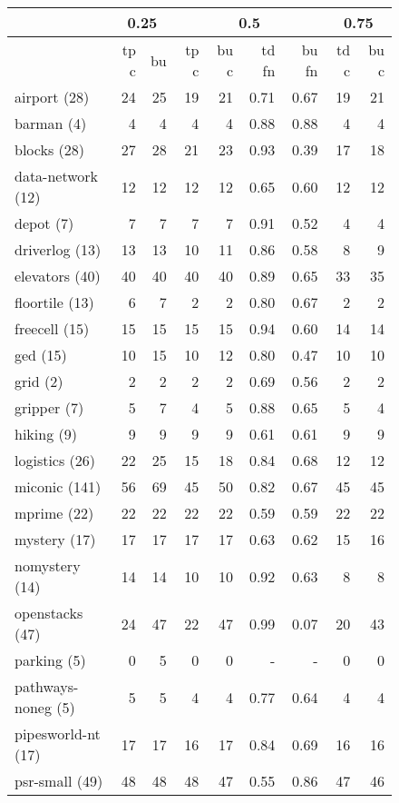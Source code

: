 \begin{figure}[ht]
	\small
\begin{tabular}{l||rr||rr|rr||rr}
	& \multicolumn{2}{c}{0.25} & \multicolumn{4}{c}{0.5} & \multicolumn{2}{c}{0.75} \\\hline
		& tp c & bu & tp c & bu c & td fn & bu fn & td c & bu c \\\hline
		airport (28) & 24 & 25 & 19 & 21 & 0.71 & 0.67 & 19 & 21\\
		barman (4) & 4 & 4 & 4 & 4 & 0.88 & 0.88 & 4 & 4\\
		blocks (28) & 27 & 28 & 21 & 23 & 0.93 & 0.39 & 17 & 18\\
		data-network (12) & 12 & 12 & 12 & 12 & 0.65 & 0.60 & 12 & 12\\
		depot (7) & 7 & 7 & 7 & 7 & 0.91 & 0.52 & 4 & 4\\
		driverlog (13) & 13 & 13 & 10 & 11 & 0.86 & 0.58 & 8 & 9\\
		elevators (40) & 40 & 40 & 40 & 40 & 0.89 & 0.65 & 33 & 35\\
		floortile (13) & 6 & 7 & 2 & 2 & 0.80 & 0.67 & 2 & 2\\
		freecell (15) & 15 & 15 & 15 & 15 & 0.94 & 0.60 & 14 & 14\\
		ged (15) & 10 & 15 & 10 & 12 & 0.80 & 0.47 & 10 & 10\\
		grid (2) & 2 & 2 & 2 & 2 & 0.69 & 0.56 & 2 & 2\\
		gripper (7) & 5 & 7 & 4 & 5 & 0.88 & 0.65 & 5 & 4\\
		hiking (9) & 9 & 9 & 9 & 9 & 0.61 & 0.61 & 9 & 9\\
		logistics (26) & 22 & 25 & 15 & 18 & 0.84 & 0.68 & 12 & 12\\
		miconic (141) & 56 & 69 & 45 & 50 & 0.82 & 0.67 & 45 & 45\\
		mprime (22) & 22 & 22 & 22 & 22 & 0.59 & 0.59 & 22 & 22\\
		mystery (17) & 17 & 17 & 17 & 17 & 0.63 & 0.62 & 15 & 16\\
		nomystery (14) & 14 & 14 & 10 & 10 & 0.92 & 0.63 & 8 & 8\\
		openstacks (47) & 24 & 47 & 22 & 47 & 0.99 & 0.07 & 20 & 43\\
		parking (5) & 0 & 5 & 0 & 0 & - & - & 0 & 0\\
		pathways-noneg (5) & 5 & 5 & 4 & 4 & 0.77 & 0.64 & 4 & 4\\
		pipesworld-nt (17) & 17 & 17 & 16 & 17 & 0.84 & 0.69 & 16 & 16\\
		psr-small (49) & 48 & 48 & 48 & 47 & 0.55 & 0.86 & 47 & 46\\

\end{tabular}
\end{figure}
